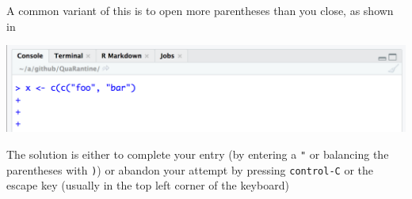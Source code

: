 \documentclass[
]{book}
\begin{document}
\begin{enumerate}
  A common variant of this is to open more parentheses than you close, as shown in

  \includegraphics{images/99-console-plus-2.png}

  The solution is either to complete your entry (by entering a \texttt{"} or balancing the parentheses with \texttt{)}) or abandon your attempt by pressing \texttt{control-C} or the escape key (usually in the top left corner of the keyboard)
\end{enumerate}

  
\end{document}
